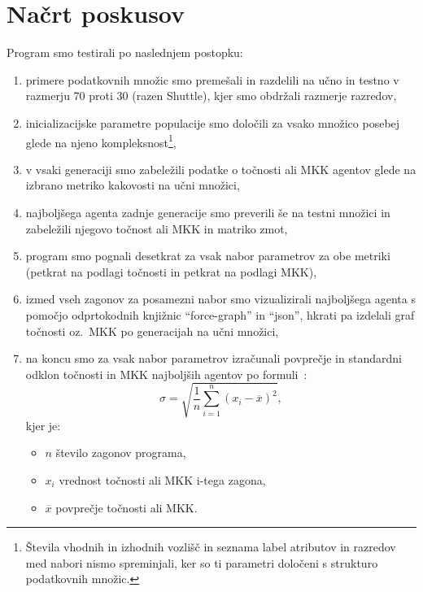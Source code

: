 \documentclass[a4paper,12pt,openright]{book}
\begin{document}
    \section{Načrt poskusov}\label{sec:nacrt-poskusov}
    Program smo testirali po naslednjem postopku:
    \begin{enumerate}
        \item primere podatkovnih množic smo premešali in razdelili na učno in testno v razmerju 70 proti 30 (razen Shuttle), kjer smo obdržali razmerje razredov,
        \item inicializacijske parametre populacije smo določili za vsako množico posebej glede na njeno kompleksnost\footnote{Števila vhodnih in izhodnih vozlišč in seznama label atributov in razredov med nabori nismo spreminjali, ker so ti parametri določeni s strukturo podatkovnih množic.},
        \item v vsaki generaciji smo zabeležili podatke o točnosti ali MKK agentov glede na izbrano metriko kakovosti na učni množici,
        \item najboljšega agenta zadnje generacije smo preverili še na testni množici in zabeležili njegovo točnost ali MKK in matriko zmot,
        \item program smo pognali desetkrat za vsak nabor parametrov za obe metriki (petkrat na podlagi točnosti in petkrat na podlagi MKK),
        \item izmed vseh zagonov za posamezni nabor smo vizualizirali naj\-bolj\-še\-ga agenta s pomočjo odprtokodnih knjižnic \enquote{force-graph}\cite{Vasturiano}
        in \enquote{json}\cite{Lohmann_JSON_for_Modern_2023}, hkrati pa izdelali graf točnosti oz.\ MKK po generacijah na učni množici,
        \item na koncu smo za vsak nabor parametrov izračunali povprečje in standardni odklon točnosti in MKK najboljših agentov po formuli~\cite{enwiki:1168408775}:
        \begin{equation}
            \sigma=\sqrt{\frac{1}{n}\sum_{i=1}^{n}(x_i-\overline{x})^2},
            \label{eq:standardni_odklon}
        \end{equation}
        kjer je:
        \begin{itemize}
            \vspace{-0.2cm}\item $n$ število zagonov programa,
            \vspace{-0.2cm}\item $x_i$ vrednost točnosti ali MKK i-tega zagona,
            \vspace{-0.2cm}\item $\overline{x}$ povprečje točnosti ali MKK.
        \end{itemize}
    \end{enumerate}
\end{document}
